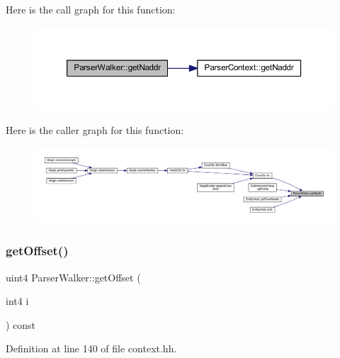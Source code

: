 Here is the call graph for this function\+:
\nopagebreak
\begin{figure}[H]
\begin{center}
\leavevmode
\includegraphics[width=350pt]{class_parser_walker_a32fdda0fe14a36c08a4740550e40c0ea_cgraph}
\end{center}
\end{figure}
Here is the caller graph for this function\+:
\nopagebreak
\begin{figure}[H]
\begin{center}
\leavevmode
\includegraphics[width=350pt]{class_parser_walker_a32fdda0fe14a36c08a4740550e40c0ea_icgraph}
\end{center}
\end{figure}
\mbox{\label{class_parser_walker_add81e215f1dd3cdc87f6d9e78de818ad}} 
\subsubsection{\texorpdfstring{getOffset()}{getOffset()}}
{\footnotesize\ttfamily uint4 Parser\+Walker\+::get\+Offset (\begin{DoxyParamCaption}\item[{int4}]{i }\end{DoxyParamCaption}) const\hspace{0.3cm}{\ttfamily [inline]}}



Definition at line 140 of file context.\+hh.

